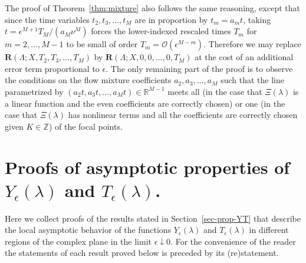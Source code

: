 \documentclass[12pt]{amsart}
\numberwithin{equation}{section}
\newcommand{\SP}{\lambda}
\newcommand{\tailint}{\Xi}
\newcommand{\eps}{\epsilon}
\newcommand{\bigo}[1]{ \mathcal{O}\! \left( #1 \right) }
\begin{document}
The proof of Theorem~\ref{thm:mixture} also follows the same reasoning, except that since the time variables $t_2,t_3,\dots,t_M$ are in proportion by $t_m=a_mt$, taking $t=\epsilon^{M+1}T_M/(a_M\nu^M)$ forces the lower-indexed rescaled times $T_m$ for $m=2,\dots,M-1$ to be small of order $T_m=\bigo{\epsilon^{M-m}}$.  Therefore we may replace $\mathbf{R}(\Lambda;X,T_2,T_3,\dots,T_M)$ by $\mathbf{R}(\Lambda;X,0,0,\dots,0,T_M)$ at the cost of an additional error term proportional to $\epsilon$.  The only remaining part of the proof is to observe the conditions on the flow mixture coefficients $a_2,a_3,\dots,a_M$ such that the line parametrized by $(a_2t,a_3t,\dots,a_Mt)\in\mathbb{R}^{M-1}$ meets all (in the case that $\tailint(\SP)$ is a linear function and the even coefficients are correctly chosen) or one (in the case that $\tailint(\SP)$ has nonlinear terms and all the coefficients are correctly chosen given $K\in\mathbb{Z}$) of the focal points.  



\appendix

\section{Proofs of asymptotic properties of $Y_\epsilon(\SP)$ and $T_\epsilon(\SP)$.}
\label{sec-proofs}


Here we collect proofs of the results stated in Section~\ref{sec-prop-YT} that describe the local asymptotic behavior of the functions $Y_\epsilon(\SP)$ and $T_\epsilon(\SP)$ in different regions of the complex plane in the limit $\eps \downarrow 0$. For the convenience of the reader the statements of each result proved below is preceded by its (re)statement.

\Yexterior*
\end{document}
